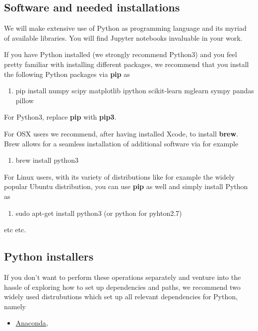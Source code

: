\documentclass[%
oneside,                 %
final,                   %
10pt]{article}
\begin{document}
\subsection{Software and needed installations}

We will make extensive use of Python as programming language and its
myriad of available libraries.  You will find
Jupyter notebooks invaluable in your work.

If you have Python installed (we strongly recommend Python3) and you feel
pretty familiar with installing different packages, we recommend that
you install the following Python packages via \textbf{pip} as 

\begin{enumerate}
\item pip install numpy scipy matplotlib ipython scikit-learn mglearn sympy pandas pillow 
\end{enumerate}

\noindent
For Python3, replace \textbf{pip} with \textbf{pip3}.

For OSX users we recommend, after having installed Xcode, to
install \textbf{brew}. Brew allows for a seamless installation of additional
software via for example 

\begin{enumerate}
\item brew install python3
\end{enumerate}

\noindent
For Linux users, with its variety of distributions like for example the widely popular Ubuntu distribution,
you can use \textbf{pip} as well and simply install Python as 

\begin{enumerate}
\item sudo apt-get install python3  (or python for pyhton2.7)
\end{enumerate}

\noindent
etc etc. 

\subsection{Python installers}

If you don't want to perform these operations separately and venture
into the hassle of exploring how to set up dependencies and paths, we
recommend two widely used distrubutions which set up all relevant
dependencies for Python, namely 

\begin{itemize}
\item \href{{https://docs.anaconda.com/}}{Anaconda}, 
\end{itemize}
\end{document}
